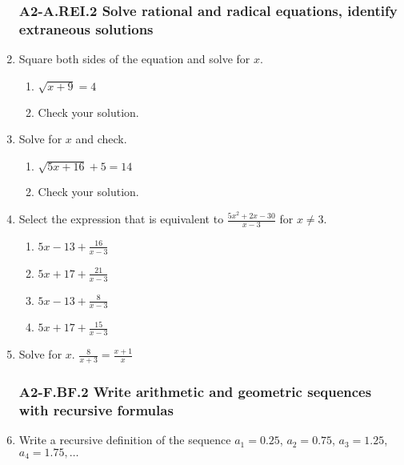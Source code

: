 \documentclass[12pt, twoside]{article}
\begin{document}
\begin{enumerate}[itemsep=0.5cm]
\subsubsection*{A2-A.REI.2 Solve rational and radical equations, identify extraneous solutions}
\item Square both sides of the equation and solve for $x$.
    \begin{multicols}{2}
    \begin{enumerate}[itemsep=0.5cm]
        \item  $\sqrt{x + 9}=4$
        \item Check your solution.
    \end{enumerate}
    \end{multicols} \vspace{3cm}

\item Solve for $x$ and check.
    \begin{multicols}{2}
    \begin{enumerate}[itemsep=0.5cm]
        \item  $\sqrt{5x+16} + 5 = 14$
        \item Check your solution.
    \end{enumerate}
    \end{multicols} \vspace{3cm}

\newpage
\item Select the expression that is equivalent to $\displaystyle \frac{5x^2 + 2x - 30}{x - 3}$ for $x \neq 3$. %
    \begin{enumerate}
        \item $\displaystyle 5x - 13 + \frac{16}{x - 3}$
        \item $\displaystyle 5x + 17 + \frac{21}{x - 3}$
        \item $\displaystyle 5x - 13 + \frac{8}{x - 3}$
        \item $\displaystyle 5x + 17 + \frac{15}{x - 3}$
    \end{enumerate}
    \vspace{2cm}

\item Solve for $x$. $\displaystyle \frac{8}{x+3} = \frac{x+1}{x}$ \vspace{5cm}


\subsubsection*{A2-F.BF.2 Write arithmetic and geometric sequences with recursive formulas}
\item Write a recursive definition of the sequence $a_1 = 0.25$, $a_2 = 0.75$, $a_3 = 1.25$, $a_4 = 1.75, \ldots$ \vspace{1cm}


\end{enumerate}
\end{document}
